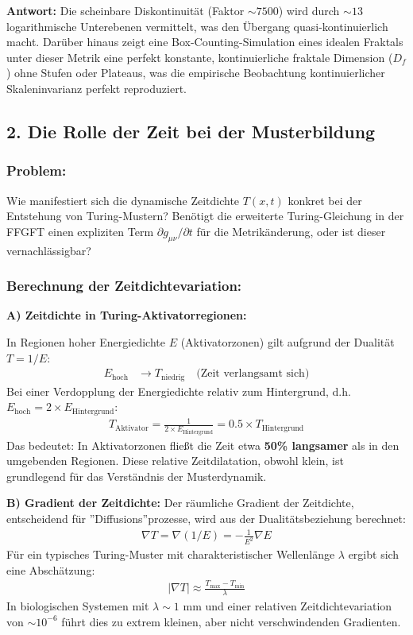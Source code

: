 \textbf{Antwort:} Die scheinbare Diskontinuität (Faktor $\sim 7500$) wird durch $\sim 13$ logarithmische Unterebenen vermittelt, was den Übergang quasi-kontinuierlich macht. Darüber hinaus zeigt eine Box-Counting-Simulation eines idealen Fraktals unter dieser Metrik eine perfekt konstante, kontinuierliche fraktale Dimension ($D_f$) ohne Stufen oder Plateaus, was die empirische Beobachtung kontinuierlicher Skaleninvarianz perfekt reproduziert.

\subsection*{2. Die Rolle der Zeit bei der Musterbildung}

\subsubsection*{Problem:}
Wie manifestiert sich die dynamische Zeitdichte $T(x,t)$ konkret bei der Entstehung von Turing-Mustern? Benötigt die erweiterte Turing-Gleichung in der FFGFT einen expliziten Term $\partial g_{\mu\nu}/\partial t$ für die Metrikänderung, oder ist dieser vernachlässigbar?

\subsubsection*{Berechnung der Zeitdichtevariation:}

\textbf{A) Zeitdichte in Turing-Aktivatorregionen:}

In Regionen hoher Energiedichte $E$ (Aktivatorzonen) gilt aufgrund der Dualität $T = 1/E$:
\begin{align*}
	E_{\text{hoch}} &\rightarrow T_{\text{niedrig}} \quad \text{(Zeit verlangsamt sich)}
\end{align*}
Bei einer Verdopplung der Energiedichte relativ zum Hintergrund, d.h. $E_{\text{hoch}} = 2 \times E_{\text{Hintergrund}}$:
\begin{align*}
	T_{\text{Aktivator}} = \frac{1}{2 \times E_{\text{Hintergrund}}} = 0.5 \times T_{\text{Hintergrund}}
\end{align*}
Das bedeutet: In Aktivatorzonen fließt die Zeit etwa \textbf{50\% langsamer} als in den umgebenden Regionen. Diese relative Zeitdilatation, obwohl klein, ist grundlegend für das Verständnis der Musterdynamik.

\textbf{B) Gradient der Zeitdichte:}
Der räumliche Gradient der Zeitdichte, entscheidend für ''Diffusions''prozesse, wird aus der Dualitätsbeziehung berechnet:
\begin{align*}
	\nabla T = \nabla(1/E) = -\frac{1}{E^2} \nabla E
\end{align*}
Für ein typisches Turing-Muster mit charakteristischer Wellenlänge $\lambda$ ergibt sich eine Abschätzung:
\begin{align*}
	|\nabla T| \approx \frac{T_{\text{max}} - T_{\text{min}}}{\lambda}
\end{align*}
In biologischen Systemen mit $\lambda \sim 1$ mm und einer relativen Zeitdichtevariation von $\sim 10^{-6}$ führt dies zu extrem kleinen, aber nicht verschwindenden Gradienten.

